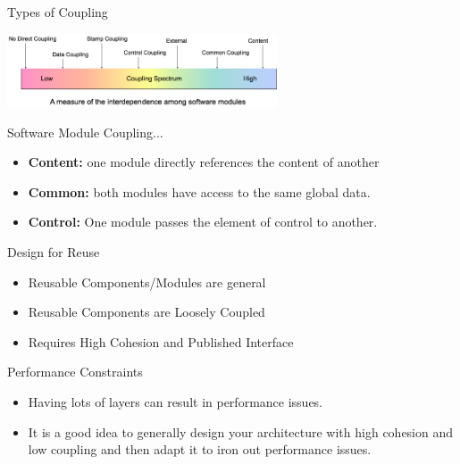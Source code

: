 \documentclass[aspectratio=1610,xcolor=dvipsnames,t,compress]{beamer}
\begin{document}
\begin{frame}{Types of Coupling}
    \begin{center}
        \includegraphics[width=0.6\textwidth]{coupling}
    \end{center}
    \begin{block}{Software Module Coupling...}
        \begin{itemize} 
            \item \textbf{Content:} one module directly references the content of another
            \item \textbf{Common:} both modules have access to the same global data.
            \item \textbf{Control:} One module passes the element of control to another.
        \end{itemize}
    \end{block}
\end{frame} 

\begin{frame}{Design for Reuse}
    \begin{itemize}
        \item Reusable Components/Modules are general
        \item Reusable Components are Loosely Coupled
        \item Requires High Cohesion and Published Interface
    \end{itemize}
\end{frame} 

\begin{frame}{Performance Constraints}
    \begin{itemize}
        \item Having lots of layers can result in performance issues.
        \item It is a good idea to generally design your architecture 
              with high cohesion and low coupling and then adapt it to 
              iron out performance issues.
    \end{itemize} 
\end{frame} 
\end{document}
